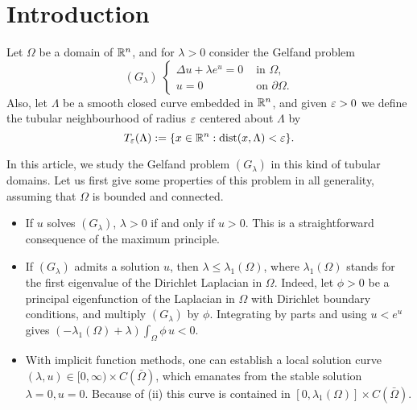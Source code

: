 
\section{Introduction}
Let $\Omega$ be a domain of $\mathbb{R}^n$, and for $\lambda>0$ consider the Gelfand
problem
\begin{equation}
    \label{eq-g-lambda}
(G_\lambda)\;\left\{ 
    \begin{array}{cl} \Delta u + \lambda e^u=0 & \mbox{ in }\Omega,\\
        u=0 & \mbox{ on }\partial \Omega.
    \end{array}\right.
\end{equation}
Also, let $\Lambda$ be a smooth closed curve embedded in $\mathbb{R}^n$, and given
$\varepsilon>0$ we define the tubular neighbourhood of radius $\varepsilon$ centered about
$\Lambda$ by
\begin{equation}
    \label{eq-tube}
    T_\varepsilon(\Lambda):= \{x\in \mathbb{R}^n: \mbox{dist}(x,\Lambda)<\varepsilon\}.
\end{equation}

In this article, we study the Gelfand problem $(G_\lambda)$ in this kind of
tubular domains. Let us first give some properties of this problem
in all generality, assuming that $\Omega$ is
bounded and connected.

\begin{itemize}
    \item[(i)] If $u$ solves $(G_\lambda)$, $\lambda>0$ if and only if $u>0$.
        This is a straightforward consequence of the maximum principle.
    \item[(ii)] If $(G_\lambda)$ admits a solution $u$, then
        $\lambda \leq \lambda_1(\Omega)$, where $\lambda_1(\Omega)$
        stands for the first eigenvalue of the Dirichlet Laplacian in $\Omega$.
        Indeed, let $\phi>0$ be a principal eigenfunction of the Laplacian in
        $\Omega$ with Dirichlet boundary conditions, and multiply $(G_\lambda)$ by
        $\phi$. Integrating by parts and using $u<e^u$ gives
        $(-\lambda_1(\Omega)+\lambda)\int_\Omega \phi\,u < 0$.
    \item[(iii)] With implicit function methods, one can establish a local
        solution curve $(\lambda, u)\in \mathopen[0,\infty)\times C(\bar\Omega)$, which
        emanates from the stable solution $\lambda=0,u=0$. Because of (ii) this
        curve is contained in $[0,\lambda_1(\Omega)]\times C(\bar\Omega)$.
\end{itemize}


